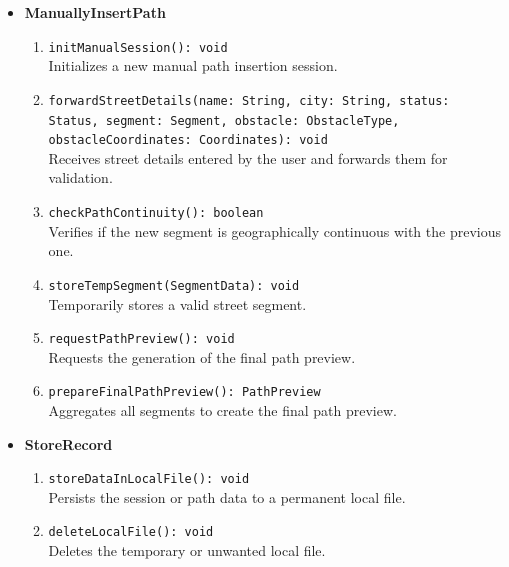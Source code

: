 \begin{itemize}
\begin{enumerate}
            \item \texttt{readSessionFile(sessionID: String): Record} \\ Helper method to read the content of a specific session file.
            \item \texttt{getPublishPreview(recordID: String): BikePath} \\ Retrieves the data of a session to be prepared for publication.
            \item \texttt{fetchPathData(recordID: String): BikePath} \\ Fetches the specific path data required for publication.
        \end{enumerate}
    \item \textbf{ManuallyInsertPath}
        \begin{enumerate}
            \item \texttt{initManualSession(): void} \\ Initializes a new manual path insertion session.
            \item \texttt{forwardStreetDetails(name: String, city: String, status: Status, segment: Segment, obstacle: ObstacleType, obstacleCoordinates: Coordinates): void} \\ Receives street details entered by the user and forwards them for validation.
            \item \texttt{checkPathContinuity(): boolean} \\ Verifies if the new segment is geographically continuous with the previous one.
            \item \texttt{storeTempSegment(SegmentData): void} \\ Temporarily stores a valid street segment.
            \item \texttt{requestPathPreview(): void} \\ Requests the generation of the final path preview.
            \item \texttt{prepareFinalPathPreview(): PathPreview} \\ Aggregates all segments to create the final path preview.
        \end{enumerate}
    \item \textbf{StoreRecord}
        \begin{enumerate}
            \item \texttt{storeDataInLocalFile(): void} \\ Persists the session or path data to a permanent local file.
            \item \texttt{deleteLocalFile(): void} \\ Deletes the temporary or unwanted local file.

\end{enumerate}
\end{itemize}
